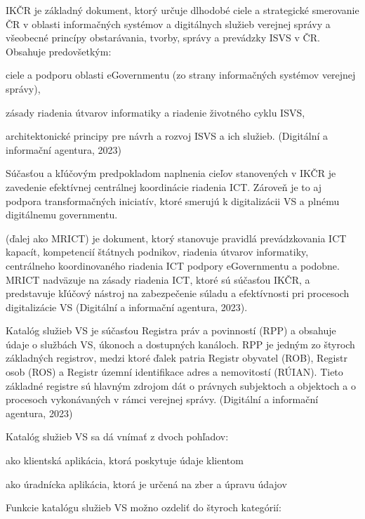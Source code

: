 IKČR je základný dokument, ktorý určuje dlhodobé ciele a strategické smerovanie ČR v oblasti informačných systémov a digitálnych služieb verejnej správy a všeobecné princípy obstarávania, tvorby, správy a prevádzky ISVS v ČR. Obsahuje predovšetkým:
\startitemize
\item{ciele a podporu oblasti eGovernmentu (zo strany informačných systémov verejnej správy),}
\item{zásady riadenia útvarov informatiky a riadenie životného cyklu ISVS,}
\item{architektonické principy pre návrh a rozvoj ISVS a ich služieb. \scr(Digitální a informační agentura, 2023)}
\stopitemize

Súčasťou a kľúčovým predpokladom naplnenia cieľov stanovených v IKČR je zavedenie efektívnej centrálnej koordinácie riadenia ICT. Zároveň je to aj podpora transformačných iniciatív, ktoré smerujú k digitalizácii VS a plnému digitálnemu governmentu.

 (ďalej ako MRICT) je dokument, ktorý stanovuje pravidlá prevádzkovania ICT kapacít, kompetencií štátnych podnikov, riadenia útvarov informatiky, centrálneho koordinovaného riadenia ICT podpory eGovernmentu a podobne. MRICT nadväzuje na zásady riadenia ICT, ktoré sú súčasťou IKČR, a predstavuje kľúčový nástroj na zabezpečenie súladu a efektívnosti pri procesoch digitalizácie VS \scr(Digitální a informační agentura, 2023).

Katalóg služieb VS je súčasťou Registra práv a povinností (RPP) a obsahuje údaje o službách VS, úkonoch a dostupných kanáloch. RPP je jedným zo štyroch základných registrov, medzi ktoré ďalek patria Registr obyvatel (ROB), Registr osob (ROS) a Registr územní identifikace adres a nemovitostí (RÚIAN). Tieto základné registre sú hlavným zdrojom dát o právnych subjektoch a objektoch a o procesoch vykonávaných v rámci verejnej správy. \scr(Digitální a informační agentura, 2023)

\blank
Katalóg služieb VS sa dá vnímať z dvoch pohľadov:

\startitemize[a]
\item{ako klientská aplikácia, ktorá poskytuje údaje klientom}
\item{ako úradnícka aplikácia, ktorá je určená na zber a úpravu údajov}
\stopitemize

Funkcie katalógu služieb VS možno ozdeliť do štyroch kategórií:

